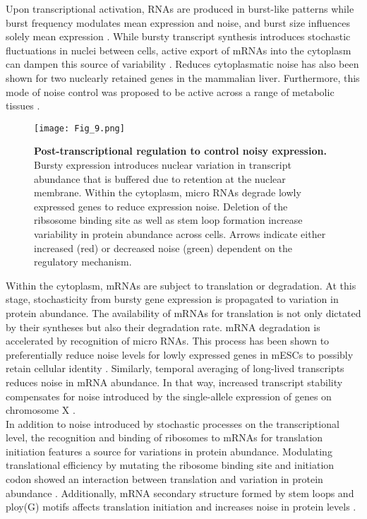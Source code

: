 Upon transcriptional activation, RNAs are produced in burst-like patterns while burst frequency modulates mean expression and noise, and burst size influences solely mean expression \citep{Hornung2012}. While bursty transcript synthesis introduces stochastic fluctuations in nuclei between cells, active export of mRNAs into the cytoplasm can dampen this source of variability \citep{Battich2015a}. Reduces cytoplasmatic noise has also been shown for two nuclearly retained genes in the mammalian liver. Furthermore, this mode of noise control was proposed to be active across a range of metabolic tissues \cite{BaharHalpern2015a}.\\

\begin{figure}[!h]
\centering
\texttt{[image: Fig\_9.png]}
\caption[Post-transcriptional regulation to control noisy expression]{\textbf{Post-transcriptional regulation to control noisy expression.}\\
Bursty expression introduces nuclear variation in transcript abundance that is buffered due to retention at the nuclear membrane. Within the cytoplasm, micro RNAs degrade lowly expressed genes to reduce expression noise. Deletion of the ribsosome binding site as well as stem loop formation increase variability in protein abundance across cells. Arrows indicate either increased (red) or decreased noise (green) dependent on the regulatory mechanism.}
\label{fig0:DNA_features}
\end{figure} 

\newpage

Within the cytoplasm, mRNAs are subject to translation or degradation. At this stage, stochasticity from bursty gene expression is propagated to variation in protein abundance. The availability of mRNAs for translation is not only dictated by their syntheses but also their degradation rate. mRNA degradation is accelerated by recognition of micro RNAs. This process has been shown to preferentially reduce noise levels for lowly expressed genes in mESCs to possibly retain cellular identity \citep{Schmiedel2015}. Similarly, temporal averaging of long-lived transcripts reduces noise in mRNA abundance. In that way, increased transcript stability compensates for noise introduced by the single-allele expression of genes on chromosome X \citep{Faure2017}.  \\

In addition to noise introduced by stochastic processes on the transcriptional level, the recognition and binding of ribosomes to mRNAs for translation initiation features a source for variations in protein abundance. Modulating translational efficiency by mutating the ribosome binding site and initiation codon showed an interaction between translation and variation in protein abundance \citep{Ozbudak2002}. Additionally, mRNA secondary structure formed by stem loops and ploy(G) motifs affects translation initiation and increases noise in protein levels \citep{Dacheux2017a}.

